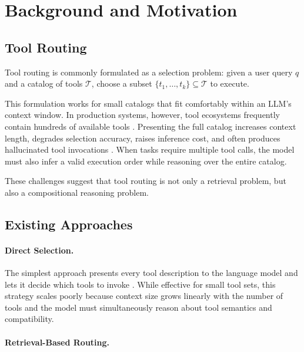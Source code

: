 \section{Background and Motivation}
\label{sec:background}

\subsection{Tool Routing}
\label{sec:tool-routing}

Tool routing is commonly formulated as a selection problem: given a user query
$q$ and a catalog of tools $\mathcal{T}$, choose a subset
$\{t_1,\ldots,t_k\}\subseteq\mathcal{T}$ to execute.

This formulation works for small catalogs that fit comfortably within an LLM's
context window. In production systems, however, tool ecosystems frequently
contain hundreds of available tools \cite{qin2024toolllm}. Presenting the full
catalog increases context length, degrades selection accuracy, raises inference
cost, and often produces hallucinated tool invocations
\cite{li2025toolscope}. When tasks require multiple tool calls, the model must
also infer a valid execution order while reasoning over the entire catalog.

These challenges suggest that tool routing is not only a retrieval problem, but
also a compositional reasoning problem.

\subsection{Existing Approaches}
\label{sec:existing-approaches}

\paragraph{Direct Selection.}

The simplest approach presents every tool description to the language model and
lets it decide which tools to invoke
\cite{schick2023toolformer,patil2024gorilla}. While effective for small tool
sets, this strategy scales poorly because context size grows linearly with the
number of tools and the model must simultaneously reason about tool semantics
and compatibility.

\paragraph{Retrieval-Based Routing.}

